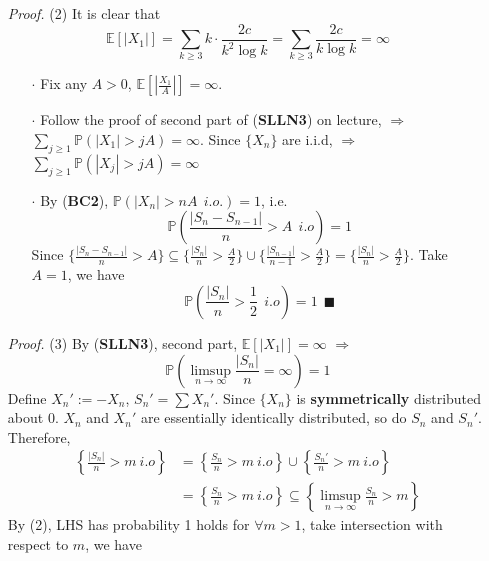 \documentclass[a4paper,12pt,twoside]{book}
\begin{document}
\begin{itemize}
	\item[]\textit{Proof.} (2) It is clear that
	\begin{equation}
		\mathbb{E}\left[|X_1|\right] = \sum_{k\geq 3} k\cdot \frac{2c}{k^2 \log k} = \sum_{k\geq 3} \frac{2c}{k \log k} = \infty
	\end{equation}
	\begin{itemize}
		\item[$\cdot$] Fix any $A>0$, $\mathbb{E}\left[|\frac{X_1}{A}|\right]=\infty$.
		\item[$\cdot$] Follow the proof of second part of (\textbf{SLLN3}) on lecture, $\Rightarrow$ $\sum_{j\geq 1}\mathbb{P}\left(|X_1|>jA\right)=\infty$. Since $\{X_n\}$ are i.i.d, $\Rightarrow$ $\sum_{j\geq 1}\mathbb{P}\left(|X_j|>jA\right)=\infty$
		\item[$\cdot$] By (\textbf{BC2}), $\mathbb{P}\left(|X_n|>nA~~i.o.\right)=1$, i.e.
		\begin{equation}
			\mathbb{P}\left(\frac{|S_n - S_{n-1}|}{n}>A~~i.o\right)=1
		\end{equation}
		Since $\{\frac{|S_n - S_{n-1}|}{n}>A\} \subseteq\{\frac{|S_n|}{n}>\frac{A}{2}\}\cup\{\frac{|S_{n-1}|}{n-1}>\frac{A}{2}\}= \{\frac{|S_n|}{n}>\frac{A}{2}\}$. Take $A=1$, we have
		\begin{equation}
			\mathbb{P}\left(\frac{|S_n|}{n}>\frac{1}{2}~~i.o\right)=1~~\blacksquare
		\end{equation}
	\end{itemize}
	\item[]\textit{Proof.} (3) By (\textbf{SLLN3}), second part, $\mathbb{E}\left[|X_1|\right]=\infty$ $\Rightarrow$
	\begin{equation}
		\mathbb{P}\left(\limsup\limits_{n\rightarrow\infty}\frac{|S_n|}{n}=\infty\right)=1
	\end{equation}
	Define $X_n':=-X_n$, $S_n'=\sum X_n'$. Since $\{X_n\}$ is \textbf{symmetrically} distributed about $0$. $X_n$ and $X_n'$ are essentially identically distributed, so do $S_n$ and $S_n'$. Therefore, 
	\begin{equation}
		\begin{split}
			\left\{\frac{|S_n|}{n}>m~i.o\right\}&=\left\{\frac{S_n}{n}>m~i.o\right\}\cup \left\{\frac{S_n'}{n}>m~i.o\right\}\\
			&=\left\{\frac{S_n}{n}>m~i.o\right\} \subseteq \left\{\limsup\limits_{n\rightarrow\infty}\frac{S_n}{n}>m\right\}
		\end{split}
	\end{equation}
	By (2), LHS has probability 1 holds for $\forall m>1$, take intersection with respect to $m$, we have

\end{itemize}
\end{document}
